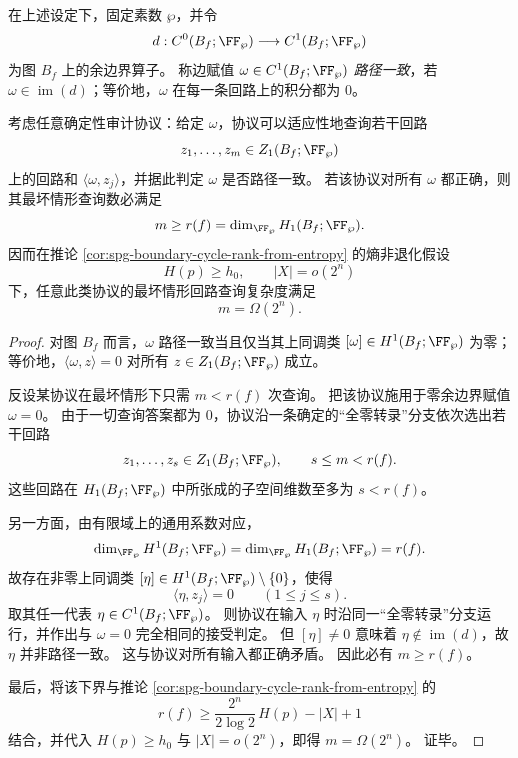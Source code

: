 \begin{theorem}[路径一致性审计的回路查询不可约下界]\label{thm:spg-boundary-cycle-audit-query-lower-bound}
在上述设定下，固定素数 \(\wp\)，并令
\[
d:C^0(B_f;\FF_\wp)\longrightarrow C^1(B_f;\FF_\wp)
\]
为图 \(B_f\) 上的余边界算子。
称边赋值 \(\omega\in C^1(B_f;\FF_\wp)\) \emph{路径一致}，若 \(\omega\in\operatorname{im}(d)\)；等价地，\(\omega\) 在每一条回路上的积分都为 \(0\)。

考虑任意确定性审计协议：给定 \(\omega\)，协议可以适应性地查询若干回路
\[
z_1,\dots,z_m\in Z_1(B_f;\FF_\wp)
\]
上的回路和 \(\langle\omega,z_j\rangle\)，并据此判定 \(\omega\) 是否路径一致。
若该协议对所有 \(\omega\) 都正确，则其最坏情形查询数必满足
\[
m\ge r(f)=\dim_{\FF_\wp}H_1(B_f;\FF_\wp).
\]
因而在推论 \ref{cor:spg-boundary-cycle-rank-from-entropy} 的熵非退化假设
\[
H(p)\ge h_0,\qquad |X|=o(2^n)
\]
下，任意此类协议的最坏情形回路查询复杂度满足
\[
m=\Omega(2^n).
\]
\end{theorem}
\begin{proof}
对图 \(B_f\) 而言，\(\omega\) 路径一致当且仅当其上同调类 \([\omega]\in H^1(B_f;\FF_\wp)\) 为零；
等价地，\(\langle\omega,z\rangle=0\) 对所有 \(z\in Z_1(B_f;\FF_\wp)\) 成立。

反设某协议在最坏情形下只需 \(m<r(f)\) 次查询。
把该协议施用于零余边界赋值 \(\omega=0\)。
由于一切查询答案都为 \(0\)，协议沿一条确定的“全零转录”分支依次选出若干回路
\[
z_1,\dots,z_s\in Z_1(B_f;\FF_\wp),
\qquad s\le m<r(f).
\]
这些回路在 \(H_1(B_f;\FF_\wp)\) 中所张成的子空间维数至多为 \(s<r(f)\)。

另一方面，由有限域上的通用系数对应，
\[
\dim_{\FF_\wp}H^1(B_f;\FF_\wp)=\dim_{\FF_\wp}H_1(B_f;\FF_\wp)=r(f).
\]
故存在非零上同调类 \([\eta]\in H^1(B_f;\FF_\wp)\setminus\{0\}\)，使得
\[
\langle\eta,z_j\rangle=0
\qquad(1\le j\le s).
\]
取其任一代表 \(\eta\in C^1(B_f;\FF_\wp)\)。
则协议在输入 \(\eta\) 时沿同一“全零转录”分支运行，并作出与 \(\omega=0\) 完全相同的接受判定。
但 \([\eta]\neq 0\) 意味着 \(\eta\notin\operatorname{im}(d)\)，故 \(\eta\) 并非路径一致。
这与协议对所有输入都正确矛盾。
因此必有 \(m\ge r(f)\)。

最后，将该下界与推论 \ref{cor:spg-boundary-cycle-rank-from-entropy} 的
\[
r(f)\ge \frac{2^n}{2\log 2}\,H(p)-|X|+1
\]
结合，并代入 \(H(p)\ge h_0\) 与 \(|X|=o(2^n)\)，即得 \(m=\Omega(2^n)\)。
证毕。
\end{proof}
\endinput
